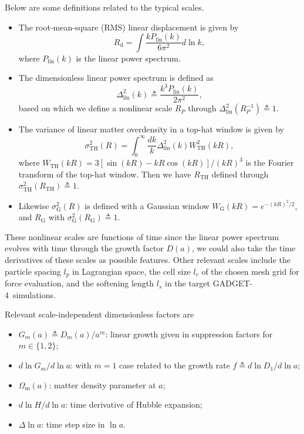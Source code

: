 \documentclass[modern, trackchanges, dvipsnames]{aastex631}
\newcommand{\GADGET}{{{\fontsize{10pt}{12pt}\selectfont GADGET}-4}}
\renewcommand{\d}{d}
\newcommand{\lna}{\ln\!a}
\newcommand{\lnk}{\ln\!k}
\newcommand{\Omegam}{\Omega_\mathrm{m}}
\newcommand{\linear}{\mathrm{lin}}
\newcommand{\tophat}{\mathrm{TH}}
\newcommand{\gauss}{\mathrm{G}}
\begin{document}
Below are some definitions related to the typical scales.
\begin{itemize}
\item The root-mean-square (RMS) linear displacement is given by
%
\begin{equation}
R_\mathrm{d} = \int \frac{k P_\linear(k)}{6\pi^2} \d\lnk,
\end{equation}
%
where $P_\linear(k)$ is the linear power spectrum.
\item The dimensionless linear power spectrum is defined as
%
\begin{equation}
\Delta^2_\linear(k) \triangleq \frac{k^3 P_\linear(k)}{2 \pi^2},
\end{equation}
%
based on which we define a nonlinear scale $R_P$ through
$\Delta_\linear^2(R_P^{-1}) \triangleq 1$.
\item The variance of linear matter overdensity in a top-hat window is given by
%
\begin{equation}
\sigma_\tophat^2(R) = \int_0^\infty \frac{\d k}k
  \Delta_\linear^2(k) W_\tophat^2(kR),
\end{equation}
%
where $W_\tophat(kR) = 3[\sin(kR) - kR\cos(kR)] / (kR)^3$ is the
Fourier transform of the top-hat window.
Then we have $R_\tophat$ defined through $\sigma_\tophat^2(R_\tophat)
\triangleq 1$.
\item Likewise $\sigma_\gauss^2(R)$ is defined with a Gaussian window
$W_\gauss(kR) = e^{-(kR)^2/2}$, and $R_\gauss$ with
$\sigma_\gauss^2(R_\gauss) \triangleq 1$.
\end{itemize}
These nonlinear scales are functions of time since the linear power
spectrum evolves with time through the growth factor $D(a)$, we could
also take the time derivatives of these scales as possible features.
Other relevant scales include the particle spacing $l_p$ in Lagrangian
space, the cell size $l_c$ of the chosen mesh grid for force evaluation,
and the softening length $l_s$ in the target \GADGET\ simulations.

Relevant scale-independent dimensionless factors are
\begin{itemize}
\item $G_m(a) \triangleq D_m(a) / a^m$: linear growth given in
  suppression factors for $m \in \{1, 2\}$;
\item $\d\ln G_m / \d\lna$: with $m=1$ case related to the growth rate
  $f \triangleq \d\ln D_1 / \d\lna$;
\item $\Omegam(a)$: matter density parameter at $a$;
\item $\d\ln\!H / \d\lna$: time derivative of Hubble expansion;
\item $\Delta\lna$: time step size in $\lna$.
\end{itemize}
\end{document}
